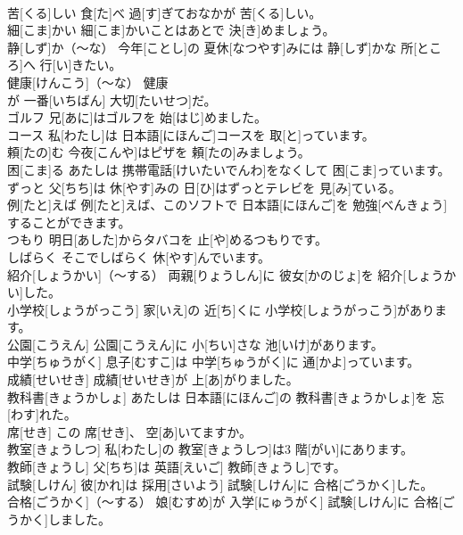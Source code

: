 \documentclass[8pt]{extreport}
\begin{document}
\begin{CJK}{UTF8}{min}
\\	苦[くる]しい	食[た]べ 過[す]ぎておなかが 苦[くる]しい。		
\\	細[こま]かい	細[こま]かいことはあとで 決[き]めましょう。		
\\	静[しず]か（～な）	今年[ことし]の 夏休[なつやす]みには 静[しず]かな 所[ところ]へ 行[い]きたい。		
\\	健康[けんこう]（～な）	健康
\\	が 一番[いちばん] 大切[たいせつ]だ。		
\\	ゴルフ	兄[あに]はゴルフを 始[はじ]めました。		
\\	コース	私[わたし]は 日本語[にほんご]コースを 取[と]っています。		
\\	頼[たの]む	今夜[こんや]はピザを 頼[たの]みましょう。		
\\	困[こま]る	あたしは 携帯電話[けいたいでんわ]をなくして 困[こま]っています。		
\\	ずっと	父[ちち]は 休[やす]みの 日[ひ]はずっとテレビを 見[み]ている。		
\\	例[たと]えば	例[たと]えば、このソフトで 日本語[にほんご]を 勉強[べんきょう]することができます。		
\\	つもり	明日[あした]からタバコを 止[や]めるつもりです。		
\\	しばらく	そこでしばらく 休[やす]んでいます。		
\\	紹介[しょうかい]（～する）	両親[りょうしん]に 彼女[かのじょ]を 紹介[しょうかい]した。		
\\	小学校[しょうがっこう]	家[いえ]の 近[ち]くに 小学校[しょうがっこう]があります。		
\\	公園[こうえん]	公園[こうえん]に 小[ちい]さな 池[いけ]があります。		
\\	中学[ちゅうがく]	息子[むすこ]は 中学[ちゅうがく]に 通[かよ]っています。		
\\	成績[せいせき]	成績[せいせき]が 上[あ]がりました。		
\\	教科書[きょうかしょ]	あたしは 日本語[にほんご]の 教科書[きょうかしょ]を 忘[わす]れた。		
\\	席[せき]	この 席[せき]、 空[あ]いてますか。		
\\	教室[きょうしつ]	私[わたし]の 教室[きょうしつ]は3 階[がい]にあります。		
\\	教師[きょうし]	父[ちち]は 英語[えいご] 教師[きょうし]です。		
\\	試験[しけん]	彼[かれ]は 採用[さいよう] 試験[しけん]に 合格[ごうかく]した。		
\\	合格[ごうかく]（～する）	娘[むすめ]が 入学[にゅうがく] 試験[しけん]に 合格[ごうかく]しました。		

\end{CJK}
\end{document}
